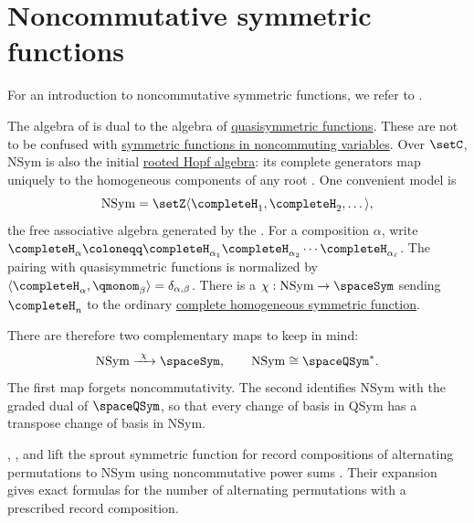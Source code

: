 
\section[nonComFunctions]{Noncommutative symmetric functions}

For an introduction to noncommutative symmetric functions,
we refer to \cite{GelfandKrobLascouxLeclercRetakhThibon1995}.

The algebra of 
\label{noncommutativeSymmetricFunctionDefinition} is dual to the algebra of
\hyperref[quasiSymmetricFunctions]{quasisymmetric functions}.
These are not to be confused with \hyperref[schurInNonCom]{symmetric
functions in noncommuting variables}.
Over $\setC$, $\mathrm{NSym}$ is also the initial
\hyperref[rootedHopfAlgebra]{rooted Hopf algebra}: its complete generators
map uniquely to the homogeneous components of any root
\cite[Thm.~3.2]{AliniaeifardWilligenburg2026x}.
One convenient model is
\[
  \mathrm{NSym}=\setZ\langle \completeH_1,\completeH_2,\dotsc\rangle,
\]
the free associative algebra generated by the \label{noncommutativeCompleteHomogeneousFunction}.
For a composition $\alpha$, write
$\completeH_\alpha\coloneqq
\completeH_{\alpha_1}\completeH_{\alpha_2}\dotsm \completeH_{\alpha_\ell}$.
The pairing with quasisymmetric functions is normalized by
$\langle \completeH_\alpha,\qmonom_\beta\rangle=\delta_{\alpha,\beta}$.
There is a \label{noncommutativeForgetfulMorphism}
$\chi:\mathrm{NSym}\to\spaceSym$ sending $\completeH_n$ to the ordinary
\hyperref[completeH]{complete homogeneous symmetric function}.

There are therefore two complementary maps to keep in mind:
\[
  \mathrm{NSym}
  \xrightarrow{\ \chi\ }
  \spaceSym,
  \qquad
  \mathrm{NSym}
  \cong
  \spaceQSym^\ast .
\]
The first map forgets noncommutativity.  The second identifies NSym with the
graded dual of \(\spaceQSym\), so that every change of basis in QSym has a
transpose change of basis in NSym.

, , and  lift the
sprout symmetric function for record compositions of alternating
permutations to NSym using noncommutative power sums
\cite{ChenOnoMogielnicki2026x}.  Their expansion gives exact formulas for the
number of alternating permutations with a prescribed record composition.

